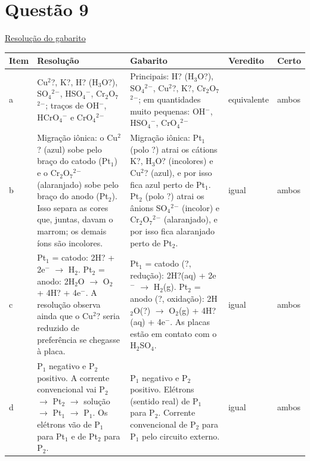 \documentclass{article}%
\begin{document}
\section*{Questão 9}%
\href{https://poliedroresolve.sistemapoliedro.com.br/vestibulares/ita/2026/ita-2-fase-dia-2-29-10-2025-2-fase-dia-2/dissertativa-9-quimica-2-fase-dia-2-ita-2026}{Resolução do gabarito}\par\smallskip%
\begin{longtable}{@{}p{} p{} p{} p{} p{}@{}}\toprule Item & Resolução & Gabarito & Veredito & Certo \\ \midrule
a & Cu$^2$?, K?, H? (H$_{3}$O?), SO$_{4}$$^2$$^{-}$, HSO$_{4}$$^{-}$, Cr$_{2}$O$_{7}$$^2$$^{-}$; traços de OH$^{-}$, HCrO$_{4}$$^{-}$ e CrO$_{4}$$^2$$^{-}$ & Principais: H? (H$_{3}$O?), SO$_{4}$$^2$$^{-}$, Cu$^2$?, K?, Cr$_{2}$O$_{7}$$^2$$^{-}$; em quantidades muito pequenas: OH$^{-}$, HSO$_{4}$$^{-}$, CrO$_{4}$$^2$$^{-}$ & equivalente & ambos \\
b & Migração iônica: o Cu$^2$? (azul) sobe pelo braço do catodo (Pt$_{1}$) e o Cr$_{2}$O$_{7}$$^2$$^{-}$ (alaranjado) sobe pelo braço do anodo (Pt$_{2}$). Isso separa as cores que, juntas, davam o marrom; os demais íons são incolores. & Migração iônica: Pt$_{1}$ (polo ?) atrai os cátions K?, H$_{3}$O? (incolores) e Cu$^2$? (azul), e por isso fica azul perto de Pt$_{1}$. Pt$_{2}$ (polo ?) atrai os ânions SO$_{4}$$^2$$^{-}$ (incolor) e Cr$_{2}$O$_{7}$$^2$$^{-}$ (alaranjado), e por isso fica alaranjado perto de Pt$_{2}$. & igual & ambos \\
c & Pt$_{1}$ = catodo: 2H? + 2e$^{-}$ $\to$ H$_{2}$. Pt$_{2}$ = anodo: 2H$_{2}$O $\to$ O$_{2}$ + 4H? + 4e$^{-}$. A resolução observa ainda que o Cu$^2$? seria reduzido de preferência se chegasse à placa. & Pt$_{1}$ = catodo (?, redução): 2H?(aq) + 2e$^{-}$ $\to$ H$_{2}$(g). Pt$_{2}$ = anodo (?, oxidação): 2H$_{2}$O(?) $\to$ O$_{2}$(g) + 4H?(aq) + 4e$^{-}$. As placas estão em contato com o H$_{2}$SO$_{4}$. & igual & ambos \\
d & P$_{1}$ negativo e P$_{2}$ positivo. A corrente convencional vai P$_{2}$ $\to$ Pt$_{2}$ $\to$ solução $\to$ Pt$_{1}$ $\to$ P$_{1}$. Os elétrons vão de P$_{1}$ para Pt$_{1}$ e de Pt$_{2}$ para P$_{2}$. & P$_{1}$ negativo e P$_{2}$ positivo. Elétrons (sentido real) de P$_{1}$ para P$_{2}$. Corrente convencional de P$_{2}$ para P$_{1}$ pelo circuito externo. & igual & ambos \\
\bottomrule\end{longtable}%
\end{document}
